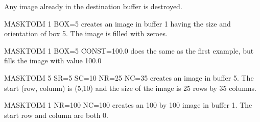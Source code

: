 Any image already in the destination buffer is destroyed.

\begin{example}
  \item[MASKTOIM 1 BOX=5\hfill]{creates an image in buffer 1 having the
       size and orientation of box 5.  The image is filled with zeroes.}

  \item[MASKTOIM 1 BOX=5 CONST=100.0\hfill]{does the same as the first
       example, but fills the image with value 100.0}

  \item[MASKTOIM 5 SR=5 SC=10 NR=25 NC=35\hfill]{creates an image in buffer
       5.  The start (row, column) is (5,10) and the size of the image is
       25 rows by 35 columns.}

  \item[MASKTOIM 1 NR=100 NC=100\hfill]{creates an 100 by 100 image in
       buffer 1.  The start row and column are both 0.}
\end{example}
